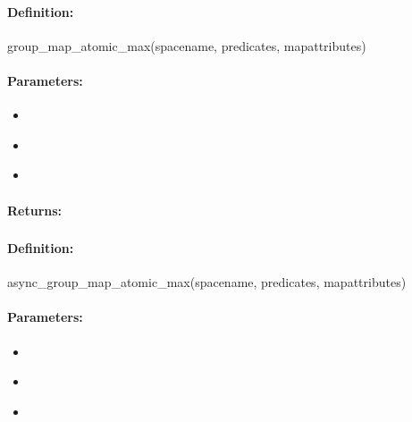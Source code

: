 \paragraph{Definition:}
\begin{rubycode}
group_map_atomic_max(spacename, predicates, mapattributes)
\end{rubycode}

\paragraph{Parameters:}
\begin{itemize}[noitemsep]
\item {}\\

\item {}\\

\item {}\\

\end{itemize}

\paragraph{Returns:}


\pagebreak
\subsubsection{}
\label{api:ruby:async_group_map_atomic_max}


\paragraph{Definition:}
\begin{rubycode}
async_group_map_atomic_max(spacename, predicates, mapattributes)
\end{rubycode}

\paragraph{Parameters:}
\begin{itemize}[noitemsep]
\item {}\\

\item {}\\

\item {}\\

\end{itemize}


